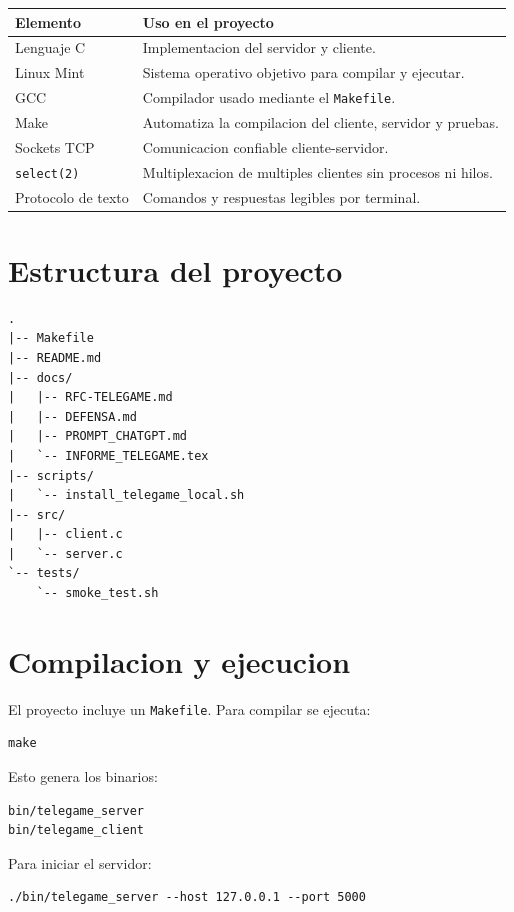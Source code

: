 \documentclass[12pt,a4paper]{article}
\begin{document}
\begin{longtable}{|p{4cm}|p{10cm}|}
\hline
\textbf{Elemento} & \textbf{Uso en el proyecto} \\
\hline
Lenguaje C & Implementacion del servidor y cliente. \\
\hline
Linux Mint & Sistema operativo objetivo para compilar y ejecutar. \\
\hline
GCC & Compilador usado mediante el \texttt{Makefile}. \\
\hline
Make & Automatiza la compilacion del cliente, servidor y pruebas. \\
\hline
Sockets TCP & Comunicacion confiable cliente-servidor. \\
\hline
\texttt{select(2)} & Multiplexacion de multiples clientes sin procesos ni hilos. \\
\hline
Protocolo de texto & Comandos y respuestas legibles por terminal. \\
\hline
\end{longtable}

\section{Estructura del proyecto}

\begin{lstlisting}[style=code]
.
|-- Makefile
|-- README.md
|-- docs/
|   |-- RFC-TELEGAME.md
|   |-- DEFENSA.md
|   |-- PROMPT_CHATGPT.md
|   `-- INFORME_TELEGAME.tex
|-- scripts/
|   `-- install_telegame_local.sh
|-- src/
|   |-- client.c
|   `-- server.c
`-- tests/
    `-- smoke_test.sh
\end{lstlisting}

\section{Compilacion y ejecucion}

El proyecto incluye un \texttt{Makefile}. Para compilar se ejecuta:

\begin{lstlisting}[style=code]
make
\end{lstlisting}

Esto genera los binarios:

\begin{lstlisting}[style=code]
bin/telegame_server
bin/telegame_client
\end{lstlisting}

Para iniciar el servidor:

\begin{lstlisting}[style=code]
./bin/telegame_server --host 127.0.0.1 --port 5000
\end{lstlisting}
\end{document}
